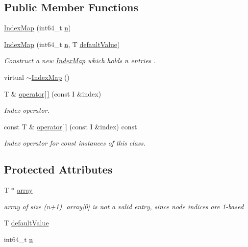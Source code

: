 \subsection*{Public Member Functions}
\begin{DoxyCompactItemize}
\item 
\hyperlink{class_ensemble_clustering_1_1_index_map_a72433a968da75b3a08e939165b489885}{Index\-Map} (int64\-\_\-t \hyperlink{class_ensemble_clustering_1_1_index_map_a3151d302c54e6ad0175bd87aef62d4ca}{n})
\item 
\hyperlink{class_ensemble_clustering_1_1_index_map_a475e833d787f15cb3ea392d2a986af3b}{Index\-Map} (int64\-\_\-t \hyperlink{class_ensemble_clustering_1_1_index_map_a3151d302c54e6ad0175bd87aef62d4ca}{n}, T \hyperlink{class_ensemble_clustering_1_1_index_map_ab5f1dc778237131e9d6c5713c2b318ec}{default\-Value})
\begin{DoxyCompactList}\small\item\em Construct a new \hyperlink{class_ensemble_clustering_1_1_index_map}{Index\-Map} which holds n entries . \end{DoxyCompactList}\item 
virtual \hyperlink{class_ensemble_clustering_1_1_index_map_aa4d08669a9bc3863b01f924c8d115328}{$\sim$\-Index\-Map} ()
\item 
T \& \hyperlink{class_ensemble_clustering_1_1_index_map_a961b55c469821e1a66cbdb1113a10f22}{operator\mbox{[}$\,$\mbox{]}} (const I \&index)
\begin{DoxyCompactList}\small\item\em Index operator. \end{DoxyCompactList}\item 
const T \& \hyperlink{class_ensemble_clustering_1_1_index_map_afa664fe610c7cd8871125ba041bb9374}{operator\mbox{[}$\,$\mbox{]}} (const I \&index) const 
\begin{DoxyCompactList}\small\item\em Index operator for const instances of this class. \end{DoxyCompactList}\end{DoxyCompactItemize}
\subsection*{Protected Attributes}
\begin{DoxyCompactItemize}
\item 
T $\ast$ \hyperlink{class_ensemble_clustering_1_1_index_map_af1d57517c8a2eac72bfe7805b65fcebc}{array}
\begin{DoxyCompactList}\small\item\em array of size (n+1). array\mbox{[}0\mbox{]} is not a valid entry, since node indices are 1-\/based \end{DoxyCompactList}\item 
T \hyperlink{class_ensemble_clustering_1_1_index_map_ab5f1dc778237131e9d6c5713c2b318ec}{default\-Value}
\item 
int64\-\_\-t \hyperlink{class_ensemble_clustering_1_1_index_map_a3151d302c54e6ad0175bd87aef62d4ca}{n}
\end{DoxyCompactItemize}


